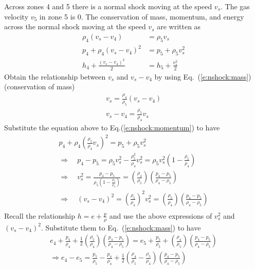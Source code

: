 \documentclass{turgon}
\begin{document}
Across zones 4 and 5 there is a normal shock moving at the speed $v_s$.
The gas velocity $v_5$ in zone 5 is 0.
The conservation of mass, momentum, and energy across the normal shock moving
at the speed $v_s$ are written as
%
\begin{align}
  \rho_4 (v_s - v_4) &= \rho_5 v_s
  \label{e:nshock:mass}
  \\
  p_4 + \rho_4 (v_s - v_4)^2 &= p_5 + \rho_5 v_s^2
  \label{e:nshock:momentum}
  \\
  h_4 + \frac{(v_s - v_4)^2}{2} &= h_5 + \frac{v_s^2}{2}
  \label{e:nshock:energe}
\end{align}
%
Obtain the relationship between $v_s$ and $v_s-v_4$ by using
Eq.~(\ref{e:nshock:mass}) (conservation of mass)
%
\begin{gather*}
  v_s = \frac{\rho_4}{\rho_5}(v_s - v_4) \\
  v_s - v_4 = \frac{\rho_5}{\rho_4}v_s
\end{gather*}
%
Substitute the equation above to Eq.(\ref{e:nshock:momentum}) to have
%
\begin{gather*}
  p_4 + \rho_4 \left(\frac{\rho_5}{\rho_4}v_s\right)^2 = p_5 + \rho_5 v_s^2 \\
  \Rightarrow \quad
  p_4 - p_5 = \rho_5 v_s^2 - \frac{\rho_5^2}{\rho_4} v_s^2
  = \rho_5 v_s^2 \left(1 - \frac{\rho_5}{\rho_4}\right) \\
  \Rightarrow \quad
  v_s^2 = \frac{p_4 - p_5}{\rho_5\left(1 - \frac{\rho_5}{\rho_4}\right)}
  = \left(\frac{\rho_4}{\rho_5}\right)
  \left(\frac{p_4 - p_5}{\rho_4 - \rho_5}\right) \\
  \Rightarrow \quad
  (v_s - v_4)^2 = \left(\frac{\rho_5}{\rho_4}\right)^2 v_s^2
  = \left(\frac{\rho_5}{\rho_4}\right)
  \left(\frac{p_4 - p_5}{\rho_4 - \rho_5}\right) \\
\end{gather*}
%
Recall the relationship $h = e + \frac{p}{\rho}$ and use the above expressions
of $v_s^2$ and $(v_s - v_4)^2$.
Substitute them to Eq.~(\ref{e:nshock:mass}) to have
%
\begin{gather*}
  e_4 + \frac{p_4}{\rho_4}
  + \frac{1}{2} \left(\frac{\rho_5}{\rho_4}\right)
  \left(\frac{p_4 - p_5}{\rho_4 - \rho_5}\right)
  = e_5 + \frac{p_5}{\rho_5}
  + \left(\frac{\rho_4}{\rho_5}\right)
  \left(\frac{p_4 - p_5}{\rho_4 - \rho_5}\right)
  \\
  \Rightarrow
  e_4 - e_5 = \frac{p_5}{\rho_5} - \frac{p_4}{\rho_4}
  + \frac{1}{2} \left(\frac{\rho_4}{\rho_5} - \frac{\rho_5}{\rho_4}\right)
  \left(\frac{p_4 - p_5}{\rho_4 - \rho_5}\right)
\end{gather*}
\end{document}
